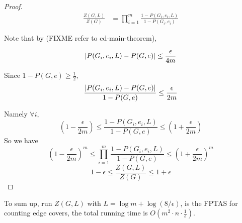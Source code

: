 \begin{proof}

	\begin{align*}
		\frac{Z(G,L)}{Z(G)} &= \prod_{i=1}^m \frac{1-P(G_i, e_i, L)}{1-P(G_i, e_i)}
	\end{align*}

	Note that by (FIXME refer to cd-main-theorem), 

	\[\left\vert P(G_i, e_i, L) - P(G,e)\right\vert \leq \frac{\epsilon}{4m}\]

	Since $1-P(G,e) \geq \frac{1}{2}$,
	\[ \frac{\left\vert P(G_i, e_i, L) - P(G,e)\right\vert}{1 - P(G,e)} \leq \frac{\epsilon}{2m}\]
	
	Namely $\forall i$,
	\[ \left( 1 - \frac{\epsilon}{2m} \right) \leq \frac{1-P(G_i, e_i, L)}{1 - P(G,e)} \leq \left( 1 + \frac{\epsilon}{2m} \right)\]
	So we have
	\[ \left( 1 - \frac{\epsilon}{2m} \right)^m \leq \prod_{i=1}^m \frac{1-P(G_i, e_i, L)}{1 - P(G,e)} \leq \left( 1 + \frac{\epsilon}{2m} \right)^m\]
	\[ 1- \epsilon \leq \frac{Z(G, L)}{Z(G)} \leq 1+ \epsilon\]


\end{proof}

To sum up, run $Z(G, L)$ with $L = \log m + \log(8/ \epsilon)$, is the FPTAS for counting edge covers,
the total running time is $O(m^2 \cdot n \cdot \frac{1}{\epsilon})$.
